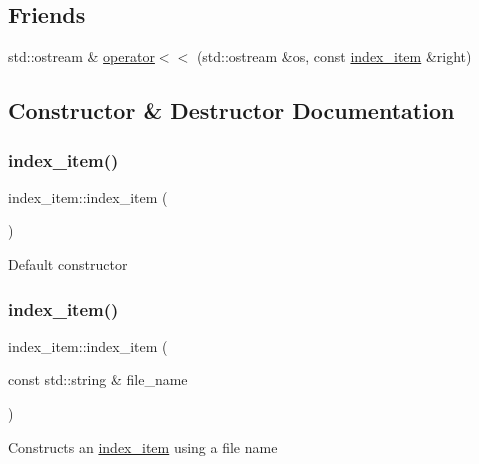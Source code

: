 \subsection*{Friends}
\begin{DoxyCompactItemize}
\item 
std\+::ostream \& \hyperlink{classindex__item_a27bd13f3db83c91ed012784e4f667822}{operator$<$$<$} (std\+::ostream \&os, const \hyperlink{classindex__item}{index\+\_\+item} \&right)
\end{DoxyCompactItemize}


\subsection{Constructor \& Destructor Documentation}
\mbox{\label{classindex__item_a26948d7ad5975fe8160fdedb58df9904}} 
\subsubsection{\texorpdfstring{index\+\_\+item()}{index\_item()}\hspace{0.1cm}{\footnotesize\ttfamily [1/2]}}
{\footnotesize\ttfamily index\+\_\+item\+::index\+\_\+item (\begin{DoxyParamCaption}{ }\end{DoxyParamCaption})}

Default constructor \mbox{\label{classindex__item_a1afb2c0d82acdec4707ffc1793fba0ff}} 
\subsubsection{\texorpdfstring{index\+\_\+item()}{index\_item()}\hspace{0.1cm}{\footnotesize\ttfamily [2/2]}}
{\footnotesize\ttfamily index\+\_\+item\+::index\+\_\+item (\begin{DoxyParamCaption}\item[{const std\+::string \&}]{file\+\_\+name }\end{DoxyParamCaption})}

Constructs an \hyperlink{classindex__item}{index\+\_\+item} using a file name 


